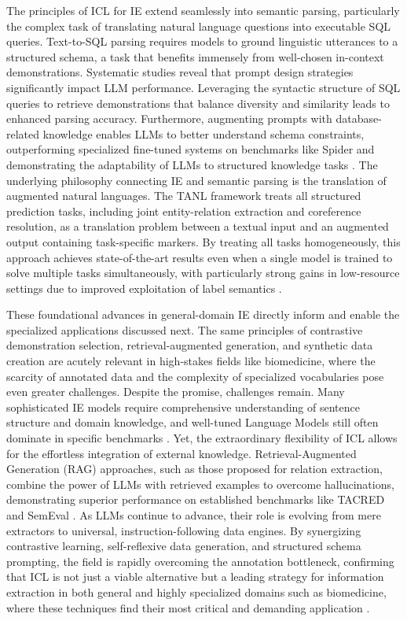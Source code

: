 \documentclass[11pt]{article}
\begin{document}
The principles of ICL for IE extend seamlessly into semantic parsing, particularly the complex task of translating natural language questions into executable SQL queries. Text-to-SQL parsing requires models to ground linguistic utterances to a structured schema, a task that benefits immensely from well-chosen in-context demonstrations. Systematic studies reveal that prompt design strategies significantly impact LLM performance. Leveraging the syntactic structure of SQL queries to retrieve demonstrations that balance diversity and similarity leads to enhanced parsing accuracy. Furthermore, augmenting prompts with database-related knowledge enables LLMs to better understand schema constraints, outperforming specialized fine-tuned systems on benchmarks like Spider and demonstrating the adaptability of LLMs to structured knowledge tasks \cite{ref507}. The underlying philosophy connecting IE and semantic parsing is the translation of augmented natural languages. The TANL framework treats all structured prediction tasks, including joint entity-relation extraction and coreference resolution, as a translation problem between a textual input and an augmented output containing task-specific markers. By treating all tasks homogeneously, this approach achieves state-of-the-art results even when a single model is trained to solve multiple tasks simultaneously, with particularly strong gains in low-resource settings due to improved exploitation of label semantics \cite{ref508}.

These foundational advances in general-domain IE directly inform and enable the specialized applications discussed next. The same principles of contrastive demonstration selection, retrieval-augmented generation, and synthetic data creation are acutely relevant in high-stakes fields like biomedicine, where the scarcity of annotated data and the complexity of specialized vocabularies pose even greater challenges. Despite the promise, challenges remain. Many sophisticated IE models require comprehensive understanding of sentence structure and domain knowledge, and well-tuned Language Models still often dominate in specific benchmarks \cite{ref499}. Yet, the extraordinary flexibility of ICL allows for the effortless integration of external knowledge. Retrieval-Augmented Generation (RAG) approaches, such as those proposed for relation extraction, combine the power of LLMs with retrieved examples to overcome hallucinations, demonstrating superior performance on established benchmarks like TACRED and SemEval \cite{ref509}. As LLMs continue to advance, their role is evolving from mere extractors to universal, instruction-following data engines. By synergizing contrastive learning, self-reflexive data generation, and structured schema prompting, the field is rapidly overcoming the annotation bottleneck, confirming that ICL is not just a viable alternative but a leading strategy for information extraction in both general and highly specialized domains such as biomedicine, where these techniques find their most critical and demanding application \cite{ref510}.
\end{document}
